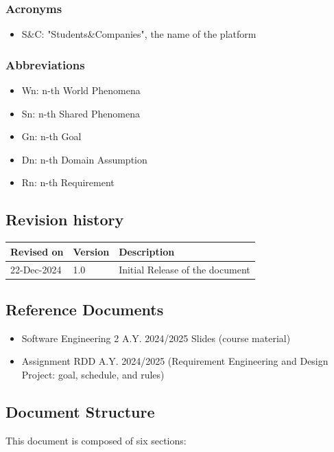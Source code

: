 \documentclass{article}
\begin{document}
\subsubsection{Acronyms}
    \begin{itemize}
        \item S\&C: "Students\&Companies", the name of the platform
    \end{itemize}
\subsubsection{Abbreviations}
    \begin{itemize}
        \item Wn: n-th World Phenomena
        \item Sn: n-th Shared Phenomena
        \item Gn: n-th Goal
        \item Dn: n-th Domain Assumption
        \item Rn: n-th Requirement
    \end{itemize}
\subsection{Revision history}
\noindent
\begin{tabularx}{\textwidth}{llX}
    \toprule
    Revised on & Version & Description \\
    \midrule
    22-Dec-2024 & 1.0 & Initial Release of the document \\
    \bottomrule
\end{tabularx}
\vspace{0.33pt}
\subsection{Reference Documents}
    \begin{itemize}
        \item Software Engineering 2 A.Y. 2024/2025 Slides (course material)
        \item Assignment RDD A.Y. 2024/2025 (Requirement Engineering and Design Project: goal, schedule, and rules)
    \end{itemize}

\subsection{Document Structure}
    This document is composed of six sections:
\end{document}
